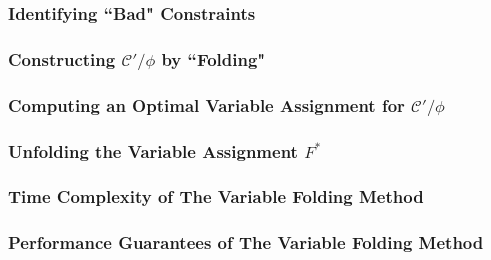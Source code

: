 \documentclass[letterpaper, 12pt]{article}
\numberwithin{equation}{section}
\begin{document}
\subsubsection{Identifying ``Bad" Constraints}

\subsubsection{Constructing $\mathcal{C}'/\phi$ by ``Folding"}

\subsubsection{Computing an Optimal Variable Assignment for $\mathcal{C}'/\phi$}

\subsubsection{Unfolding the Variable Assignment $F^*$}

\subsubsection{Time Complexity of The Variable Folding Method}

\subsubsection{Performance Guarantees of The Variable Folding Method}
\end{document}
